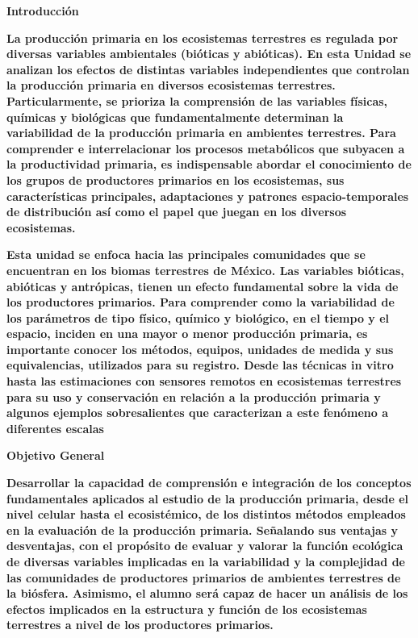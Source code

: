 \documentclass[
]{article}
\begin{document}
\textbf{Introducción}

\textbf{La producción primaria en los ecosistemas terrestres es regulada
por diversas variables ambientales (bióticas y abióticas). En esta
Unidad se analizan los efectos de distintas variables independientes que
controlan la producción primaria en diversos ecosistemas terrestres.
Particularmente, se prioriza la comprensión de las variables físicas,
químicas y biológicas que fundamentalmente determinan la variabilidad de
la producción primaria en ambientes terrestres. Para comprender e
interrelacionar los procesos metabólicos que subyacen a la productividad
primaria, es indispensable abordar el conocimiento de los grupos de
productores primarios en los ecosistemas, sus características
principales, adaptaciones y patrones espacio-temporales de distribución
así como el papel que juegan en los diversos ecosistemas.}

\textbf{Esta unidad se enfoca hacia las principales comunidades que se
encuentran en los biomas terrestres de México. Las variables bióticas,
abióticas y antrópicas, tienen un efecto fundamental sobre la vida de
los productores primarios. Para comprender como la variabilidad de los
parámetros de tipo físico, químico y biológico, en el tiempo y el
espacio, inciden en una mayor o menor producción primaria, es importante
conocer los métodos, equipos, unidades de medida y sus equivalencias,
utilizados para su registro. Desde las técnicas in vitro hasta las
estimaciones con sensores remotos en ecosistemas terrestres para su uso
y conservación en relación a la producción primaria y algunos ejemplos
sobresalientes que caracterizan a este fenómeno a diferentes escalas}

\textbf{\hfill\break
}

\textbf{Objetivo General}

\textbf{Desarrollar la capacidad de comprensión e integración de los
conceptos fundamentales aplicados al estudio de la producción primaria,
desde el nivel celular hasta el ecosistémico, de los distintos métodos
empleados en la evaluación de la producción primaria. Señalando sus
ventajas y desventajas, con el propósito de evaluar y valorar la función
ecológica de diversas variables implicadas en la variabilidad y la
complejidad de las comunidades de productores primarios de ambientes
terrestres de la biósfera. Asimismo, el alumno será capaz de hacer un
análisis de los efectos implicados en la estructura y función de los
ecosistemas terrestres a nivel de los productores primarios.}
\end{document}
